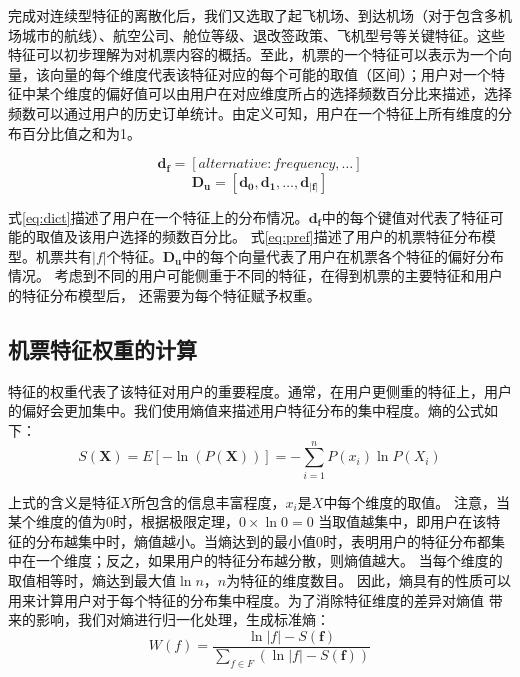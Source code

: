 完成对连续型特征的离散化后，我们又选取了起飞机场、到达机场（对于包含多机场城市的航线）、航空公司、舱位等级、退改签政策、飞机型号等关键特征。这些特征可以初步理解为对机票内容的概括。至此，机票的一个特征可以表示为一个向量，该向量的每个维度代表该特征对应的每个可能的取值（区间）；用户对一个特征中某个维度的偏好值可以由用户在对应维度所占的选择频数百分比来描述，选择频数可以通过用户的历史订单统计。由定义可知，用户在一个特征上所有维度的分布百分比值之和为1。

\begin{equation}
\label{eq:dict}
	\mathbf{d_f} = [alternative:frequency,\dots]
\end{equation}
\begin{equation}
\label{eq:pref}
	\mathbf{D_u} = [\mathbf{d_0},\mathbf{d_1},\dots,\mathbf{d_{|f|}}]
\end{equation}

式\ref{eq:dict}描述了用户在一个特征上的分布情况。$\mathbf{d_f}$中的每个键值对代表了特征可能的取值及该用户选择的频数百分比。
式\ref{eq:pref}描述了用户的机票特征分布模型。机票共有$|f|$个特征。$\mathbf{D_u}$中的每个向量代表了用户在机票各个特征的偏好分布情况。
考虑到不同的用户可能侧重于不同的特征，在得到机票的主要特征和用户的特征分布模型后，
还需要为每个特征赋予权重。

\subsection{机票特征权重的计算}

特征的权重代表了该特征对用户的重要程度。通常，在用户更侧重的特征上，用户的偏好会更加集中。我们使用熵值来描述用户特征分布的集中程度。熵的公式如下：
\begin{equation}
\label{eq:entropy}
	S(\mathbf{X}) = E[-\ln (P(\mathbf{X}))] = - \sum_{i=1}^n P(x_i)\ln P(X_i)
\end{equation}

上式的含义是特征$X$所包含的信息丰富程度，$x_i$是$X$中每个维度的取值。
注意，当某个维度的值为$0$时，根据极限定理，$0 \times \ln 0 = 0$
当取值越集中，即用户在该特征的分布越集中时，熵值越小。当熵达到的最小值$0$时，表明用户的特征分布都集中在一个维度；反之，如果用户的特征分布越分散，则熵值越大。
当每个维度的取值相等时，熵达到最大值$\ln n$，$n$为特征的维度数目。
因此，熵具有的性质可以用来计算用户对于每个特征的分布集中程度。为了消除特征维度的差异对熵值
带来的影响，我们对熵进行归一化处理，生成标准熵：
\begin{equation}
  W(f) = \frac{\ln |f| - S(\mathbf{f})}{\sum_{f \in F}(\ln |f| - S(\mathbf{f}))}
\end{equation}

